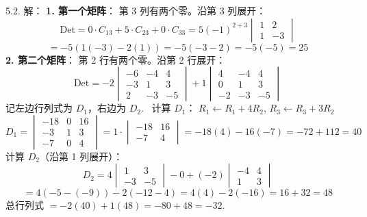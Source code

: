 \begin{exer}
5.2. 解：
\textbf{1. 第一个矩阵}：
第 3 列有两个零。沿第 3 列展开：
$$ \text{Det} = 0 \cdot C_{13} + 5 \cdot C_{23} + 0 \cdot C_{33} = 5 (-1)^{2+3} \begin{vmatrix} 1 & 2 \\ 1 & -3 \end{vmatrix} $$
$$ = -5 (1(-3) - 2(1)) = -5 (-3 - 2) = -5(-5) = 25 $$
\textbf{2. 第二个矩阵}：
第 2 行有两个零。沿第 2 行展开：
$$ \text{Det} = -2 \begin{vmatrix} -6 & -4 & 4 \\ -3 & 1 & 3 \\ 2 & -3 & -5 \end{vmatrix} + 1 \begin{vmatrix} 4 & -4 & 4 \\ 0 & 1 & 3 \\ -2 & -3 & -5 \end{vmatrix} $$
记左边行列式为 $D_1$，右边为 $D_2$.~
计算 $D_1$：
$R_1 \leftarrow R_1 + 4R_2$, $R_3 \leftarrow R_3 + 3R_2$
$$ D_1 = \begin{vmatrix} -18 & 0 & 16 \\ -3 & 1 & 3 \\ -7 & 0 & 4 \end{vmatrix} = 1 \cdot \begin{vmatrix} -18 & 16 \\ -7 & 4 \end{vmatrix} = -18(4) - 16(-7) = -72 + 112 = 40 $$
计算 $D_2$（沿第 1 列展开）：
$$ D_2 = 4 \begin{vmatrix} 1 & 3 \\ -3 & -5 \end{vmatrix} - 0 + (-2) \begin{vmatrix} -4 & 4 \\ 1 & 3 \end{vmatrix} $$
$$ = 4(-5 - (-9)) - 2(-12 - 4) = 4(4) - 2(-16) = 16 + 32 = 48 $$
总行列式 $= -2(40) + 1(48) = -80 + 48 = -32$.~


\end{exer}
